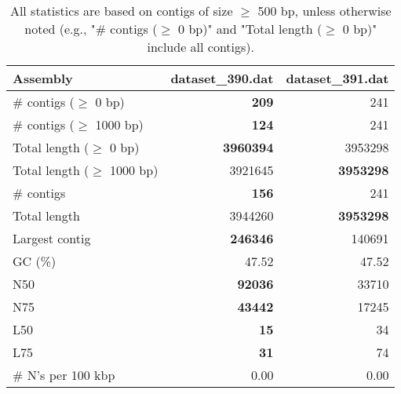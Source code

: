 \documentclass[12pt,a4paper]{article}
\begin{document}
\begin{table}[ht]
\begin{center}
\caption{All statistics are based on contigs of size $\geq$ 500 bp, unless otherwise noted (e.g., "\# contigs ($\geq$ 0 bp)" and "Total length ($\geq$ 0 bp)" include all contigs).}
\begin{tabular}{|l*{2}{|r}|}
\hline
Assembly & dataset\_390.dat & dataset\_391.dat \\ \hline
\# contigs ($\geq$ 0 bp) & {\bf 209} & 241 \\ \hline
\# contigs ($\geq$ 1000 bp) & {\bf 124} & 241 \\ \hline
Total length ($\geq$ 0 bp) & {\bf 3960394} & 3953298 \\ \hline
Total length ($\geq$ 1000 bp) & 3921645 & {\bf 3953298} \\ \hline
\# contigs & {\bf 156} & 241 \\ \hline
Total length & 3944260 & {\bf 3953298} \\ \hline
Largest contig & {\bf 246346} & 140691 \\ \hline
GC (\%) & 47.52 & 47.52 \\ \hline
N50 & {\bf 92036} & 33710 \\ \hline
N75 & {\bf 43442} & 17245 \\ \hline
L50 & {\bf 15} & 34 \\ \hline
L75 & {\bf 31} & 74 \\ \hline
\# N's per 100 kbp & 0.00 & 0.00 \\ \hline
\end{tabular}
\end{center}
\end{table}
\end{document}

